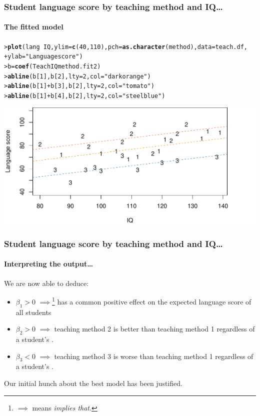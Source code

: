 \documentclass{beamer}\usepackage[]{graphicx}\usepackage[]{xcolor}
\makeatletter
\def\maxwidth{ %
  \ifdim\Gin@nat@width>\linewidth
    \linewidth
  \else
    \Gin@nat@width
  \fi
}
\newcommand{\hlnum}[1]{\textcolor[rgb]{0.686,0.059,0.569}{#1}}%
\newcommand{\hlstr}[1]{\textcolor[rgb]{0.192,0.494,0.8}{#1}}%
\newcommand{\hlopt}[1]{\textcolor[rgb]{0,0,0}{#1}}%
\newcommand{\hlstd}[1]{\textcolor[rgb]{0.345,0.345,0.345}{#1}}%
\newcommand{\hlkwb}[1]{\textcolor[rgb]{0.69,0.353,0.396}{#1}}%
\newcommand{\hlkwc}[1]{\textcolor[rgb]{0.333,0.667,0.333}{#1}}%
\newcommand{\hlkwd}[1]{\textcolor[rgb]{0.737,0.353,0.396}{\textbf{#1}}}%
\newenvironment{kframe}{%
 \def\at@end@of@kframe{}%
 \ifinner\ifhmode%
  \def\at@end@of@kframe{\end{minipage}}%
  \begin{minipage}{\columnwidth}%
 \fi\fi%
 \def\FrameCommand##1{\hskip\@totalleftmargin \hskip-\fboxsep
 \colorbox{shadecolor}{##1}\hskip-\fboxsep
     \hskip-\linewidth \hskip-\@totalleftmargin \hskip\columnwidth}%
 \MakeFramed {\advance\hsize-\width
   \@totalleftmargin\z@ \linewidth\hsize
   \@setminipage}}%
 {\par\unskip\endMakeFramed%
 \at@end@of@kframe}
\newenvironment{knitrout}{}{} %
\makeatother
\begin{document}
\begin{frame}[fragile]
\frametitle{Student language score by teaching method and IQ\ldots}
\framesubtitle{The fitted model}
\begin{knitrout}\scriptsize
{}\color{fgcolor}\begin{kframe}
\begin{alltt}
\hlstd{> }\hlkwd{plot}\hlstd{(lang} \hlopt{~} \hlstd{IQ,} \hlkwc{ylim}\hlstd{=}\hlkwd{c}\hlstd{(}\hlnum{40}\hlstd{,}\hlnum{110}\hlstd{),} \hlkwc{pch}\hlstd{=}\hlkwd{as.character}\hlstd{(method),} \hlkwc{data} \hlstd{= teach.df,}
\hlstd{+ }     \hlkwc{ylab}\hlstd{=}\hlstr{"Language score"}\hlstd{)}
\hlstd{> }\hlstd{b} \hlkwb{=} \hlkwd{coef}\hlstd{(TeachIQmethod.fit2)}
\hlstd{> }\hlkwd{abline}\hlstd{(b[}\hlnum{1}\hlstd{], b[}\hlnum{2}\hlstd{],} \hlkwc{lty} \hlstd{=} \hlnum{2}\hlstd{,} \hlkwc{col} \hlstd{=} \hlstr{"darkorange"}\hlstd{)}
\hlstd{> }\hlkwd{abline}\hlstd{(b[}\hlnum{1}\hlstd{]} \hlopt{+} \hlstd{b[}\hlnum{3}\hlstd{], b[}\hlnum{2}\hlstd{],} \hlkwc{lty} \hlstd{=} \hlnum{2}\hlstd{,} \hlkwc{col} \hlstd{=} \hlstr{"tomato"}\hlstd{)}
\hlstd{> }\hlkwd{abline}\hlstd{(b[}\hlnum{1}\hlstd{]} \hlopt{+} \hlstd{b[}\hlnum{4}\hlstd{], b[}\hlnum{2}\hlstd{],} \hlkwc{lty} \hlstd{=} \hlnum{2}\hlstd{,} \hlkwc{col} \hlstd{=} \hlstr{"steelblue"}\hlstd{)}
\end{alltt}
\end{kframe}
\includegraphics[width=\maxwidth]{figure/RC-H09-0022b-1} 
\end{knitrout}
\end{frame}



\begin{frame}[fragile]
\frametitle{Student language score by teaching method and IQ\ldots}
\framesubtitle{Interpreting the output\ldots}
We are now able to deduce:
\bigskip
\begin{itemize}
\item $\beta_1>0$ $\implies$\footnote{ $\implies$ means \emph{implies that}.}  has a common positive effect on the expected language score of all students
\item $\beta_{2}>0$ $\implies$ teaching method 2  is better than teaching method 1 regardless of a student's .
\item $\beta_{3}< 0$ $\implies$ teaching method 3 is worse than teaching method 1 regardless of a student's .
\end{itemize}
\bigskip
Our initial hunch about the best model has been justified.
\end{frame}
\end{document}
